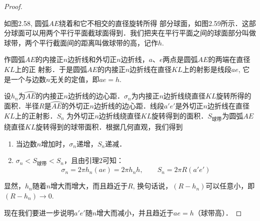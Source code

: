 \begin{proof}
\begin{figure}[htp]
    \caption{}
\end{figure}

如图2.58, 圆弧$AE$绕着和它不相交的直径旋转所得
部分球面，如图2.59所示．这部分球面可以用两个平行平面截球面得到．我们把夹在平行平面之间的球面部分叫做球带，两个平行截面间的距离叫做球带的高，记作$h$. 
\begin{figure}[htp]
    \centering
{}
    \caption{}
\end{figure}

作圆弧$AE$的内接正$n$边折线和外切正$n$边折线，$a$、$e$两点是圆弧$AE$的两端在直径$KL$上的正
射影．于是圆弧$AE$的内接正$n$边折线在直径$KL$上的射影是线段$ae$, 它是一个与边数$n$无关的定值，即$ae=h$.

设$h_n$为$\wideparen{AE}$的内接正$n$边折线的边心距．$\sigma_n$为内接正$n$边折线绕直径$KL$旋转所得的面积．半径$R$是$\wideparen{AE}$的外切正$n$边折线的边心距．线段$a'e'$是外切正$n$边折线在直径$KL$上的正射影．$S_n$ 为外切正$n$边折线绕直径$KL$旋转得到的面积．$S_{\text{球带}}$为圆弧$AE$绕直径$KL$旋转得到的球带面积．根据几何直观，我们得到
\begin{enumerate}
\item 当边数$n$增加时，$\sigma_n$递增，$S_n$递减．
\item $\sigma_n<S_{\text{球带}}<S_n$，且由引理2可知：
\[\sigma_n=2\pi h_n(ae)=2\pi h_n h,\qquad S_n =2\pi R (a'e')\]    
\end{enumerate}

显然，$h_n$随着$n$增大而增大，而且趋近于$R$, 换句话说，$(R-h_n)$可以任意小，即$(R-h_n)\to 0$. 

现在我们要进一步说明$a'e'$随$n$增大而减小，并且趋近于$ae=h$（球带高）．


\end{proof}
